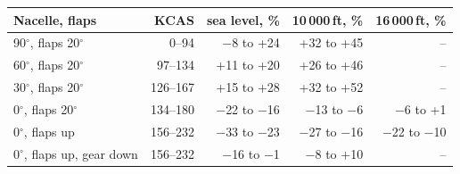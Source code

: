 \begin{tabular}{@{}lrrrr@{}}
\toprule
Nacelle, flaps & KCAS & sea level, \% & 10\,000\,ft, \% & 16\,000\,ft, \% \\
\midrule
90$^\circ$, flaps 20$^\circ$ & 0--94 & $-$8 to +24 & +32 to +45 & -- \\
60$^\circ$, flaps 20$^\circ$ & 97--134 & +11 to +20 & +26 to +46 & -- \\
30$^\circ$, flaps 20$^\circ$ & 126--167 & +15 to +28 & +32 to +52 & -- \\
0$^\circ$, flaps 20$^\circ$ & 134--180 & $-$22 to $-$16 & $-$13 to $-$6 & $-$6 to +1 \\
0$^\circ$, flaps up & 156--232 & $-$33 to $-$23 & $-$27 to $-$16 & $-$22 to $-$10 \\
0$^\circ$, flaps up, gear down & 156--232 & $-$16 to $-$1 & $-$8 to +10 & -- \\
\bottomrule
\end{tabular}
